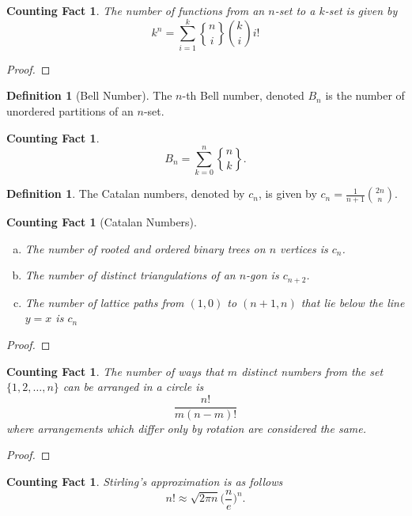 \documentclass[12]{article}
\newcounter{countingFactCounter}
\newtheorem{countingFact}[countingFactCounter]{Counting Fact}
\theoremstyle{definition}
\newtheorem{defn}[thm]{Definition} %
\begin{document}
	\begin{countingFact}
		The number of functions from an $n$-set to a $k$-set is given by
		$$k^n = \sum_{i=1}^k {n \brace i}{k \choose i}i!$$
	\end{countingFact}
	\begin{proof}
		
	\end{proof}

	\begin{defn}[Bell Number]
		The $n$-th Bell number, denoted $B_n$ is the number of unordered partitions of an $n$-set.
	\end{defn}

	\begin{countingFact}
		$$B_n = \sum_{k=0}^n {n \brace k}.$$
	\end{countingFact}

	\begin{defn}
		The Catalan numbers, denoted by $c_n$, is given by $c_n = \frac{1}{n+1}{2n \choose n}$.
	\end{defn}

	\begin{countingFact}[Catalan Numbers]
		\
		\begin{enumerate}[a)]
			\item The number of rooted and ordered binary trees on $n$ vertices is $c_n$.
			\item The number of distinct triangulations of an $n$-gon is $c_{n+2}$.
			\item The number of lattice paths from $(1,0)$ to $(n+1,n)$ that lie below the line $y = x$ is $c_n$
		\end{enumerate}
	\end{countingFact}
	\begin{proof}
		
	\end{proof}

	\begin{countingFact}
		The number of ways that $m$ distinct numbers from the set $\{1, 2, \ldots, n\}$ can be arranged in a circle is
		$$\frac{n!}{m(n-m)!}$$
		where arrangements which differ only by rotation are considered the same.
	\end{countingFact}
	\begin{proof}
		
	\end{proof}

	\begin{countingFact}
		Stirling's approximation is as follows
		$$n! \approx \sqrt{2\pi n}\biggr( \frac{n}{e} \biggr)^n.$$
	\end{countingFact}
	
\end{document}
